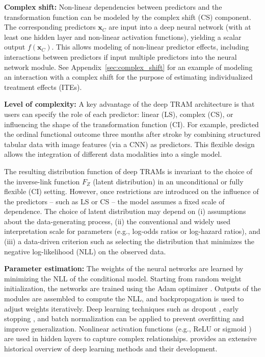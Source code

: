 \medskip

\textbf{Complex shift:} Non-linear dependencies between predictors and the transformation function can be modeled by the complex shift (CS) component. The corresponding predictors $\mathbf{x}_{C}$ are input into a deep neural network (with at least one hidden layer and non-linear activation functions), yielding a scalar output $f(\mathbf{x}_{C})$. This allows modeling of non-linear predictor effects, including interactions between predictors if input multiple predictors into the neural network module. See Appendix~\ref{sec:complex_shift} for an example of modeling an interaction with a complex shift for the purpose of estimating individualized treatment effects (ITEs).

\medskip

\textbf{Level of complexity:} A key advantage of the deep TRAM architecture is that users can specify the role of each predictor: linear (LS), complex (CS), or influencing the shape of the transformation function (CI). For example, \citet{herzog2023} predicted the ordinal functional outcome three months after stroke by combining structured tabular data with image features (via a CNN) as predictors. This flexible design allows the integration of different data modalities into a single model.


\medskip

The resulting distribution function of deep TRAMs is invariant to the choice of the inverse-link function $F_Z$ (latent distribution) in an unconditional \citep{hothorn2018} or fully flexible (CI) setting. However, once restrictions are introduced on the influence of the predictors -- such as LS or CS -- the model assumes a fixed scale of dependence. The choice of latent distribution may depend on (i) assumptions about the data-generating process, (ii) the conventional and widely used interpretation scale for parameters (e.g., log-odds ratios or log-hazard ratios), and (iii) a data-driven criterion such as selecting the distribution that minimizes the negative log-likelihood (NLL) on the observed data.

%
\medskip

\textbf{Parameter estimation:} The weights of the neural networks are learned by minimizing the NLL of the conditional model. Starting from random weight initialization, the networks are trained using the Adam optimizer \citep{kingma2015}. Outputs of the modules are assembled to compute the NLL, and backpropagation \citep{rumelhart1986} is used to adjust weights iteratively. Deep learning techniques such as dropout \citep{srivastava2014}, early stopping \citep{prechelt2012}, and batch normalization \citep{Ioffe2015} can be applied to prevent overfitting and improve generalization. Nonlinear activation functions (e.g., ReLU \citealp{glorot2011} or sigmoid \citealp{rumelhart1986}) are used in hidden layers to capture complex relationships. \citet{schmidhuber2015} provides an extensive historical overview of deep learning methods and their development.




